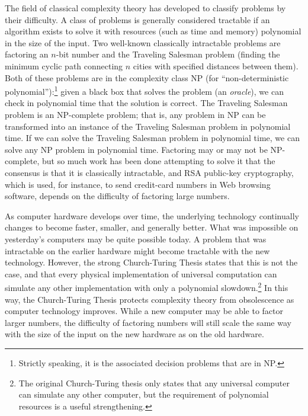 \documentclass{report}
\begin{document}
The field of classical complexity theory has developed to classify problems
by their difficulty.  A class of problems is generally considered tractable 
if an algorithm exists to solve it with resources (such as time and memory) 
polynomial in the size of the input.  Two well-known classically intractable 
problems are factoring an $n$-bit number and the Traveling Salesman problem (finding the minimum cyclic path connecting $n$ cities with specified distances 
between them).  Both of these problems are in the complexity class NP (for 
``non-deterministic polynomial''):\footnote{Strictly speaking, it is the 
associated decision problems that are in NP.} given a black box that solves 
the problem (an {\em oracle}), we can check in polynomial time that the 
solution is correct.  The Traveling Salesman problem is an NP-complete problem; 
that is, any problem in NP can be transformed into an instance of the Traveling 
Salesman problem in polynomial time.  If we can solve the Traveling 
Salesman problem in polynomial time, we can solve any NP problem in polynomial
time.  Factoring may or may not be NP-complete, but so much work has been done 
attempting to solve it that the consensus is that it is classically 
intractable, and RSA public-key cryptography, which is used, for instance, to 
send credit-card numbers in Web browsing software, depends on the difficulty of 
factoring large numbers.

As computer hardware develops over time, the underlying technology continually 
changes to become faster, smaller, and generally better.  What was 
impossible on yesterday's computers may be quite possible today.  A 
problem that was intractable on the earlier hardware might become 
tractable with the new technology.  However, the strong Church-Turing Thesis 
\cite{church-turing} states that this is not the case, and that every physical 
implementation of universal computation can simulate any other 
implementation with only a polynomial slowdown.\footnote{The original
Church-Turing thesis only states that any universal computer can simulate
any other computer, but the requirement of polynomial resources is a
useful strengthening.}  In this way, the Church-Turing 
Thesis protects complexity theory from obsolescence as computer technology 
improves.  While a new computer may be able to factor larger numbers, the 
difficulty of factoring numbers will still scale the same way with the size 
of the input on the new hardware as on the old hardware.
\end{document}
